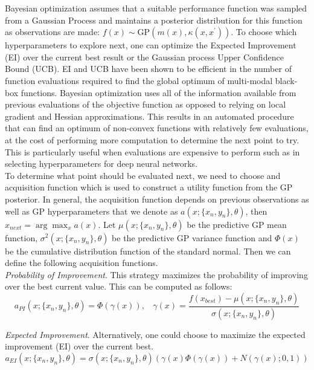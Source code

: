 Bayesian optimization assumes that a suitable performance function was sampled from a Gaussian Process and maintains a posterior distribution for this function as observations are made: $f(x)\sim \mathrm{GP}(m(x),\kappa(x,x^{\prime}))$. To choose which hyperparameters to explore next, one can optimize the Expected Improvement (EI) over the current best result or the Gaussian process Upper Confidence Bound (UCB). EI and UCB have been shown to be efficient in the number of function evaluations required to find the global optimum of multi-modal black-box functions. Bayesian optimization uses all of the information available from previous evaluations of the objective function as opposed to relying on local gradient and Hessian approximations. This results in an automated procedure that can find an optimum of non-convex functions with relatively few evaluations, at the cost of performing more computation to determine the next point to try. This is particularly useful when evaluations are expensive to perform such as in selecting hyperparameters for deep neural networks.\\

To determine what point should be evaluated next, we need to choose and acquisition function which is used to construct a utility function from the GP posterior. In general, the acquisition function depends on previous observations as well as GP hyperparameters that we denote as $a(x;\{x_n,y_n\},\theta)$, then $x_{next} = \arg \max_x a(x)$. Let $\mu(x;\{x_n,y_n\},\theta)$ be the predictive GP mean function, $\sigma^{2}(x;\{x_n,y_n\},\theta)$ be the predictive GP variance function and $\Phi(x)$ be the cumulative distribution function of the standard normal. Then we can define the following acquisition functions.\\

\textit{Probability of Improvement}. This strategy maximizes the probability of improving over the best current value. This can be computed as follows:
\begin{equation}
    a_{PI}(x;\{x_n,y_n\},\theta) = \Phi(\gamma(x)), ~~~~ \gamma(x) = \frac{f(x_{best}) - \mu(x; \{x_n,y_n\},\theta)}{\sigma(x;\{x_n,y_n\},\theta)}
\end{equation}

\textit{Expected Improvement}. Alternatively, one could choose to maximize the expected improvement (EI) over the current best. 
\begin{equation}
    a_{EI}(x;\{x_n,y_n\},\theta) = \sigma(x;\{x_n,y_n\},\theta)(\gamma(x)\Phi(\gamma(x))+N(\gamma(x);0,1))
\end{equation}

